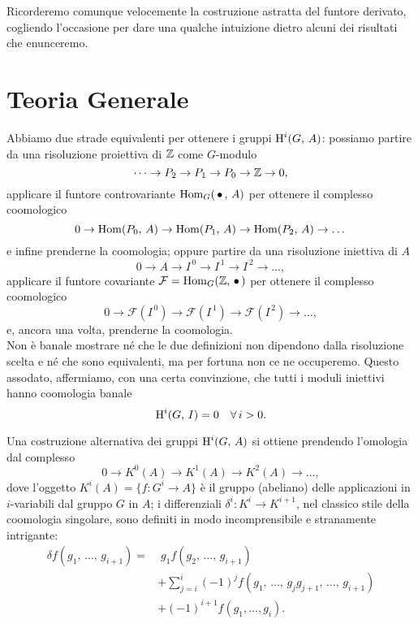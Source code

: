 Ricorderemo comunque velocemente la costruzione astratta del funtore derivato, cogliendo l'occasione per dare una qualche intuizione dietro alcuni dei risultati che enunceremo. 

\section{Teoria Generale}
Abbiamo due strade equivalenti per ottenere i gruppi $ \operatorname{H}^i(G, \, A) $: possiamo partire da una risoluzione proiettiva di $ \mathbb{Z} $ come $ G $-modulo
\[ \dots \to P_2 \to P_1 \to P_0 \to \mathbb{Z} \to 0, \]
applicare il funtore controvariante $ \operatorname{Hom}_G(\, \bullet\,, \, A) $ per ottenere il complesso coomologico
\[ 0 \to \operatorname{Hom}(P_0, \, A) \to \operatorname{Hom}(P_1, \, A) \to \operatorname{Hom}(P_2, \, A) \to \dots \]
e infine prenderne la coomologia; oppure partire da una risoluzione iniettiva di $ A $
\[ 0 \to A \to I^{\,0} \to I^{\,1} \to I^{\,2} \to \dots, \]
applicare il funtore covariante $ \mathcal{F} = \operatorname{Hom}_G(\mathbb{Z}, \, \bullet \, ) $ per ottenere il complesso coomologico
\[ 0 \to \mathcal{F}\left(I^{\,0}\right) \to \mathcal{F}\left(I^{\,1}\right) \to \mathcal{F}\left(I^{\,2}\right) \to \dots, \]
e, ancora una volta, prenderne la coomologia. \\

Non è banale mostrare né che le due definizioni non dipendono dalla risoluzione scelta e né che sono equivalenti, ma per fortuna non ce ne occuperemo. Questo assodato, affermiamo, con una certa convinzione, che tutti i moduli iniettivi hanno coomologia banale
\begin{equation} \label{injban}
	\operatorname{H}^i(G, \, I) = 0 \quad \forall \, i > 0.
\end{equation}

Una costruzione alternativa dei gruppi $ \operatorname{H}^i(G, \, A) $ si ottiene prendendo l'omologia dal complesso
\[ 0 \to K^0(A) \to K^1(A) \to K^2 (A) \to \dots, \]
dove l'oggetto $ K^i(A) = \{ f \colon G^i \to A\} $ è il gruppo (abeliano) delle applicazioni in $ i $-variabili dal gruppo $ G $ in $ A $; i differenziali $ \delta^i \colon K^i \to K^{i+1} $, nel classico stile della coomologia singolare, sono definiti in modo incomprensibile e stranamente intrigante:
\begin{align*}
	\delta f(g_1, \, \dots, \, g_{i+1}) = & \;  g_1 f(g_2, \, \dots, \, g_{i+1}) \\ & + \sum_{j = i}^{i} (-1)^j f(g_1, \, \dots, \, g_jg_{j+1}, \, \dots, \, g_{i+1}) \\ & + (-1)^{i+1} f(g_1, \dots, g_i).
\end{align*}

